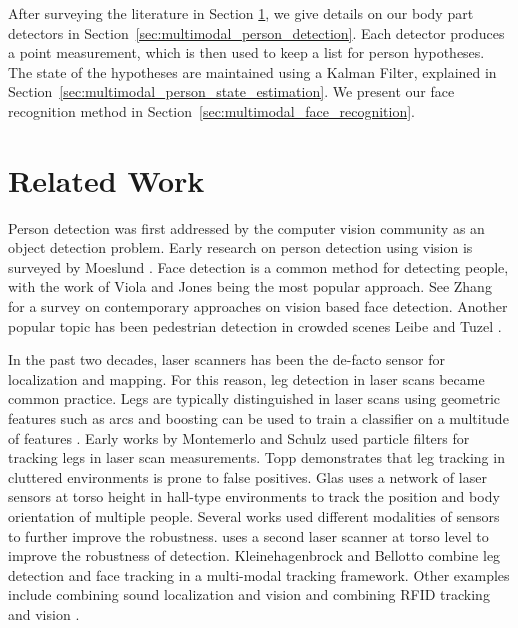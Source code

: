 After surveying the literature in Section \ref{sec:multimodal_related_work}, we give details on our body part detectors in Section~\ref{sec:multimodal_person_detection}. Each detector produces a point measurement, which is then used to keep a list for person hypotheses. The state of the hypotheses are maintained using a Kalman Filter, explained in Section~\ref{sec:multimodal_person_state_estimation}. We present our face recognition method in Section~\ref{sec:multimodal_face_recognition}.

\section{Related Work}
\label{sec:multimodal_related_work}

Person detection was first addressed by the computer vision community as an object detection problem. Early research on person detection using vision is surveyed by Moeslund \cite{moeslund2001}. Face detection is a common method for detecting people, with the work of Viola and Jones \cite{viola2004robust} being the most popular approach. See Zhang \cite{zhang2010survey} for a survey on contemporary approaches on vision based face detection. Another popular topic has been pedestrian detection in crowded scenes Leibe \cite{leibe2005pedestrian} and Tuzel \cite{tuzel2007human}.

In the past two decades, laser scanners has been the de-facto sensor for localization and mapping. For this reason, leg detection in laser scans became common practice. Legs are typically distinguished in laser scans using geometric features such as arcs \cite{xavier2005fast} and boosting can be used to train a classifier on a multitude of features \cite{arras2007using}. Early works by Montemerlo \cite{montemerlo2002conditional} and Schulz \cite{schulz2001tracking} used particle filters for tracking legs in laser scan measurements. Topp \cite{topp2005tracking} demonstrates that leg tracking in cluttered environments is prone to false positives. Glas \cite{glas2009laser} uses a network of laser sensors at torso height in hall-type environments to track the position and body orientation of multiple people. Several works used different modalities of sensors to further improve the robustness. \cite{Carballo2008} uses a second laser scanner at torso level to improve the robustness of detection. Kleinehagenbrock \cite{kleinehagenbrock2002person} and Bellotto \cite{bellotto2009multisensor} combine leg detection and face tracking in a multi-modal tracking framework. Other examples include combining sound localization and vision \cite{bernardin2007audio} and combining RFID tracking and vision \cite{germa2010vision}.

